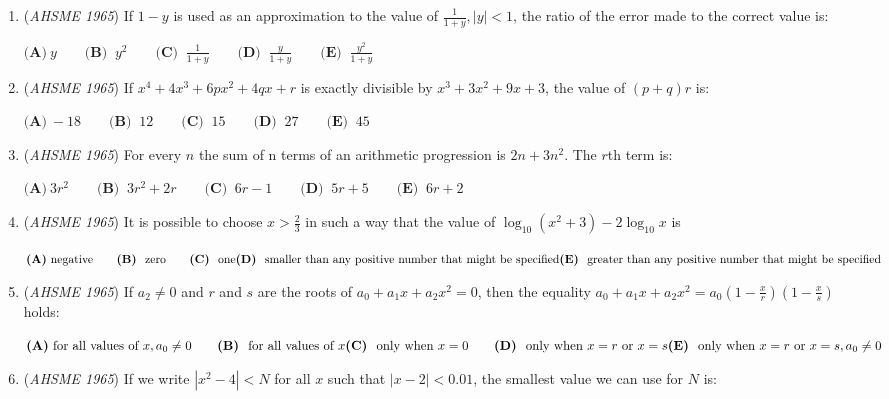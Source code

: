 \begin{enumerate}
	\item (\textit{AHSME 1965}) If $1 - y$ is used as an approximation to the value of $\frac {1}{1 + y}, |y| < 1$, the ratio of the error made to the correct value is: 


 $\textbf{(A)}\ y \qquad  \textbf{(B) }\ y^2 \qquad  \textbf{(C) }\ \frac {1}{1 + y} \qquad  \textbf{(D) }\ \frac{y}{1+y}\qquad \textbf{(E) }\ \frac{y^2}{1+y}\qquad$


	\item (\textit{AHSME 1965}) If $x^4 + 4x^3 + 6px^2 + 4qx + r$ is exactly divisible by $x^3 + 3x^2 + 9x + 3$, the value of $(p + q)r$ is: 


 $\textbf{(A)}\ - 18 \qquad  \textbf{(B) }\ 12 \qquad  \textbf{(C) }\ 15 \qquad  \textbf{(D) }\ 27 \qquad  \textbf{(E) }\ 45 \qquad$


	\item (\textit{AHSME 1965}) For every $n$ the sum of n terms of an arithmetic progression is $2n + 3n^2$. The $r$th term is: 


 $\textbf{(A)}\ 3r^2 \qquad  \textbf{(B) }\ 3r^2 + 2r \qquad  \textbf{(C) }\ 6r - 1 \qquad  \textbf{(D) }\ 5r + 5 \qquad  \textbf{(E) }\ 6r+2\qquad$


	\item (\textit{AHSME 1965}) It is possible to choose $x > \frac {2}{3}$ in such a way that the value of $\log_{10}(x^2 + 3) - 2 \log_{10}x$ is 


 $\textbf{(A)}\ \text{negative} \qquad  \textbf{(B) }\ \text{zero} \qquad  \textbf{(C) }\ \text{one} \\ \textbf{(D) }\ \text{smaller than any positive number that might be specified} \\ \textbf{(E) }\ \text{greater than any positive number that might be specified}$


	\item (\textit{AHSME 1965}) If $a_2 \neq 0$ and $r$ and $s$ are the roots of $a_0 + a_1x + a_2x^2 = 0$, then the equality 
$a_0 + a_1x + a_2x^2 = a_0\left (1 - \frac {x}{r} \right ) \left (1 - \frac {x}{s} \right )$ holds: 


 $\textbf{(A)}\ \text{for all values of }x, a_0\neq 0 \qquad \textbf{(B) }\ \text{for all values of }x \\ \textbf{(C) }\ \text{only when }x = 0 \qquad \textbf{(D) }\ \text{only when }x = r \text{ or }x = s \\ \textbf{(E) }\ \text{only when }x = r \text{ or }x = s, a_0 \neq 0$


	\item (\textit{AHSME 1965}) If we write $|x^2 - 4| < N$ for all $x$ such that $|x - 2| < 0.01$, the smallest value we can use for $N$ is: 



\end{enumerate}
